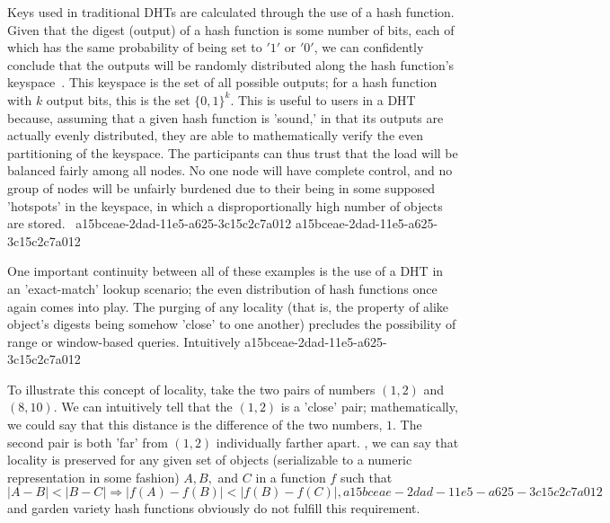 \documentclass[12pt]{article}
\begin{document}
\par Keys used in traditional DHTs are calculated through the use of a hash function. Given that the digest (output) of a hash function is some number of bits, each of which has the same probability of being set to $'1'$ or $'0'$, we can confidently conclude that the outputs will be randomly distributed along the hash function's keyspace~. This keyspace is the set of all possible outputs; for a hash function with $k$ output bits, this is the set $\{0,1\}^k$. This is useful to users in a DHT because, assuming that a given hash function is 'sound,' in that its outputs are actually evenly distributed, they are able to mathematically verify the even partitioning of the keyspace. The participants can thus trust that the load will be balanced fairly among all nodes. No one node will have complete control, and no group of nodes will be unfairly burdened due to their being in some supposed 'hotspots' in the keyspace, in which a disproportionally high number of objects are stored.~
a15bceae-2dad-11e5-a625-3c15c2c7a012
a15bceae-2dad-11e5-a625-3c15c2c7a012\par One important continuity between all of these examples is the use of a DHT in an 'exact-match' lookup scenario; the even distribution of hash functions once again comes into play. The purging of any locality (that is, the property of alike object's digests being somehow 'close' to one another) precludes the possibility of range or window-based queries. Intuitively
a15bceae-2dad-11e5-a625-3c15c2c7a012
\par To illustrate this concept of locality, take the two pairs of numbers $(1,2)$ and $(8,10)$. We can intuitively tell that the $(1,2)$ is a 'close' pair; mathematically, we could say that this distance is the difference of the two numbers, $1$. The second pair is both 'far' from $(1,2)$ individually farther apart. , we can say that locality is preserved for any given set of objects (serializable to a numeric representation in some fashion) $A,B,$ and $C$ in a function $f$ such that
\begin{equation}
|A-B| < |B-C| \Rightarrow |f(A)-f(B)| < |f(B) - f(C)|,
a15bceae-2dad-11e5-a625-3c15c2c7a012\end{equation}
and garden variety hash functions obviously do not fulfill this requirement.

\printbibliography
\end{document}
